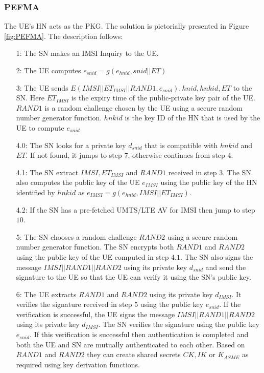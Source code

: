 \documentclass{river-journal}
\begin{document}
\subsubsection{PEFMA}
The UE's HN acts as the PKG. The solution is pictorially presented in Figure \ref{fig:PEFMA}. The description follows:

\begin{itemize}
\item[1:] The SN makes an IMSI Inquiry to the UE. 
\item[2:] The UE computes $e_{snid} = g\left(e_{hnid},snid||ET \right)$
\item[3:] The UE sends $E(IMSI||ET_{IMSI}||RAND1,e_{snid}),hnid,hnkid,ET$ to the SN. Here $ET_{IMSI}$ is the expiry time of the public-private key pair of the UE. $RAND1$ is a random challenge chosen by the UE using a secure random number generator function. $hnkid$ is the key ID of the HN that is used by the UE to compute $e_{snid}$
\item[4.0:] The SN looks for a private key $d_{snid}$ that is compatible with $hnkid$ and $ET$. If not found, it jumps to step $7$, otherwise continues from step $4$.
\item[4.1:] The SN extract $IMSI,ET_{IMSI}$ and $RAND1$ received in step $3$. The SN also computes the public key of the UE $e_{IMSI}$ using the public key of the HN identified by $hnkid$ as $e_{IMSI} = g(e_{hnid},IMSI||ET_{IMSI})$.
\item[4.2:] If the SN has a pre-fetched UMTS/LTE AV for IMSI then jump to step $10$.
\item[5:] The SN chooses a random challenge $RAND2$ using a secure random number generator function. The SN encrypts both $RAND1$ and $RAND2$ using the public key of the UE computed in step $4.1$. The SN also signs the message $IMSI||RAND1||RAND2$ using its private key $d_{snid}$ and send the signature to the UE so that the UE can verify it using the SN's public key. 
\item[6:] The UE extracts $RAND1$ and $RAND2$ using its private key $d_{IMSI}$. It verifies the signature received in step $5$ using the public key $e_{snid}$. If the verification is successful, the UE signs the message $IMSI||RAND1||RAND2$ using its private key $d_{IMSI}$. The SN verifies the signature using the public key $e_{snid}$. If this verification is successful then authentication is completed and both the UE and SN are mutually authenticated to each other. Based on $RAND1$ and $RAND2$ they can create shared secrets $CK,IK$ or $K_{ASME}$ as required using key derivation functions.


\end{itemize}
\end{document}
